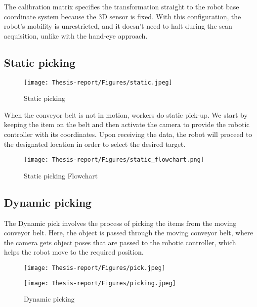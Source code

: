\documentclass[12pt]{article}
\begin{document}
The calibration matrix specifies the transformation straight to the robot base coordinate system because the 3D sensor is fixed. With this configuration, the robot's mobility is unrestricted, and it doesn't need to halt during the scan acquisition, unlike with the hand-eye approach\cite{ref2}.
\subsection{Static picking}
\begin{figure}[h]
    \centering
    \texttt{[image: Thesis-report/Figures/static.jpeg]}
    \caption{Static picking}
    \label{fig:Photoneo Cmaera}
\end{figure}

When the conveyor belt is not in motion, workers do static pick-up.  We start by keeping the item on the belt and then activate the camera to provide the robotic controller with its coordinates.  Upon receiving the data, the robot will proceed to the designated location in order to select the desired target.

\begin{figure}[h]
    \centering
    \texttt{[image: Thesis-report/Figures/static\_flowchart.png]}
    \caption{Static picking Flowchart}
    \label{fig:Photoneo Cmaera}
\end{figure}


\subsection{Dynamic picking}
The Dynamic pick involves the process of picking the items from the moving conveyor belt. Here, the object is passed through the moving conveyor belt, where the camera gets object poses that are passed to the robotic controller, which helps the robot move to the required position.\\
\begin{figure}[h]
  \centering
  \begin{minipage}{0.45\textwidth}
    \centering
    \texttt{[image: Thesis-report/Figures/pick.jpeg]}

  \end{minipage}%
  \hspace{5mm}%
  \begin{minipage}{0.45\textwidth}
    \centering
    \texttt{[image: Thesis-report/Figures/picking.jpeg]}

  \end{minipage}
  \caption{Dynamic picking}
  \label{fig:gripper-combined}
\end{figure}
\end{document}
